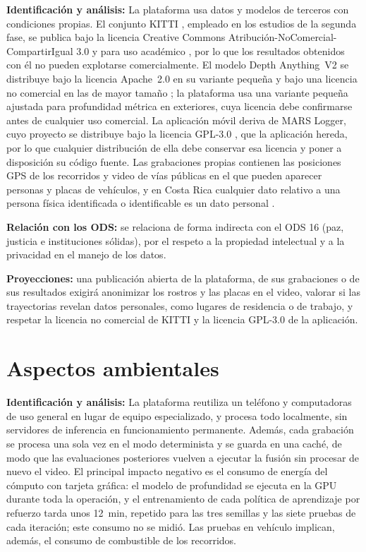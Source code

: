 \textbf{Identificación y análisis:}
La plataforma usa datos y modelos de terceros con condiciones propias.
El conjunto KITTI \cite{geiger2012kitti}, empleado en los estudios de la segunda fase, se publica bajo la licencia Creative Commons Atribución-NoComercial-CompartirIgual 3.0 y para uso académico \cite{kitti_web}, por lo que los resultados obtenidos con él no pueden explotarse comercialmente.
El modelo Depth Anything~V2 se distribuye bajo la licencia Apache~2.0 en su variante pequeña y bajo una licencia no comercial en las de mayor tamaño \cite{depthanything_repo}; la plataforma usa una variante pequeña ajustada para profundidad métrica en exteriores, cuya licencia debe confirmarse antes de cualquier uso comercial.
La aplicación móvil deriva de MARS Logger, cuyo proyecto se distribuye bajo la licencia GPL-3.0 \cite{marslogger_repo}, que la aplicación hereda, por lo que cualquier distribución de ella debe conservar esa licencia y poner a disposición su código fuente.
Las grabaciones propias contienen las posiciones GPS de los recorridos y video de vías públicas en el que pueden aparecer personas y placas de vehículos, y en Costa Rica cualquier dato relativo a una persona física identificada o identificable es un dato personal \cite{ley8968}.

\textbf{Relación con los ODS:}
se relaciona de forma indirecta con el ODS 16 (paz, justicia e instituciones sólidas), por el respeto a la propiedad intelectual y a la privacidad en el manejo de los datos.

\textbf{Proyecciones:}
una publicación abierta de la plataforma, de sus grabaciones o de sus resultados exigirá anonimizar los rostros y las placas en el video, valorar si las trayectorias revelan datos personales, como lugares de residencia o de trabajo, y respetar la licencia no comercial de KITTI y la licencia GPL-3.0 de la aplicación.

\section{Aspectos ambientales}

\textbf{Identificación y análisis:}
La plataforma reutiliza un teléfono y computadoras de uso general en lugar de equipo especializado, y procesa todo localmente, sin servidores de inferencia en funcionamiento permanente.
Además, cada grabación se procesa una sola vez en el modo determinista y se guarda en una caché, de modo que las evaluaciones posteriores vuelven a ejecutar la fusión sin procesar de nuevo el video.
El principal impacto negativo es el consumo de energía del cómputo con tarjeta gráfica: el modelo de profundidad se ejecuta en la GPU durante toda la operación, y el entrenamiento de cada política de aprendizaje por refuerzo tarda unos 12~min, repetido para las tres semillas y las siete pruebas de cada iteración; este consumo no se midió.
Las pruebas en vehículo implican, además, el consumo de combustible de los recorridos.

